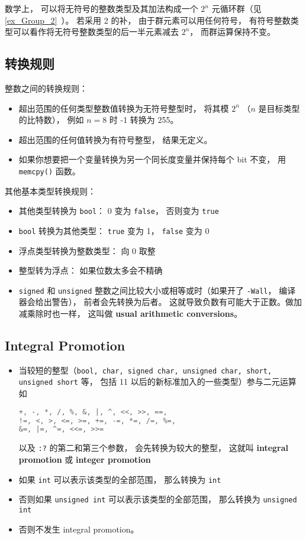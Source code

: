 数学上， 可以将无符号的整数类型及其加法构成一个 $2^n$ 元循环群（见\autoref{ex_Group_2}~）。 若采用 2 的补， 由于群元素可以用任何符号， 有符号整数类型可以看作将无符号整数类型的后一半元素减去 $2^n$， 而群运算保持不变。

\subsection{转换规则}
整数之间的转换规则：
\begin{itemize}
\item 超出范围的任何类型整数值转换为无符号整型时， 将其模 $2^n$ （$n$ 是目标类型的比特数）， 例如 $n = 8$ 时 -1 转换为 255。
\item 超出范围的任何值转换为有符号整型， 结果无定义。
\item 如果你想要把一个变量转换为另一个同长度变量并保持每个 bit 不变， 用 \verb|memcpy()| 函数。
\end{itemize}
其他基本类型转换规则：
\begin{itemize}
\item 其他类型转换为 \verb|bool|： 0 变为 \verb|false|， 否则变为 \verb|true|
\item \verb|bool| 转换为其他类型： \verb|true| 变为 1， \verb|false| 变为 0
\item 浮点类型转换为整数类型： 向 0 取整
\item 整型转为浮点： 如果位数太多会不精确
\item \verb|signed| 和 \verb|unsigned| 整数之间比较大小或相等或时（如果开了 \verb|-Wall|， 编译器会给出警告）， 前者会先转换为后者。 这就导致负数有可能大于正数。做加减乘除时也一样， 这叫做 \textbf{usual arithmetic conversions}。
\end{itemize}

\subsection{Integral Promotion}
\begin{itemize}
\item 当较短的整型（\verb|bool, char, signed char, unsigned char, short, unsigned short| 等， 包括 11 以后的新标准加入的一些类型）参与二元运算如
\begin{lstlisting}[language=cpp]
+, -, *, /, %, &, |, ^, <<, >>, ==,
!=, <, >, <=, >=, +=, -=, *=, /=, %=,
&=, |=, ^=, <<=, >>=
\end{lstlisting}
以及 \verb`:?` 的第二和第三个参数， 会先转换为较大的整型， 这就叫 \textbf{integral promotion} 或 \textbf{integer promotion}
\item 如果 \verb|int| 可以表示该类型的全部范围， 那么转换为 \verb|int|
\item 否则如果 \verb|unsigned int| 可以表示该类型的全部范围， 那么转换为 \verb|unsigned int|
\item 否则不发生 integral promotion。
\end{itemize}

